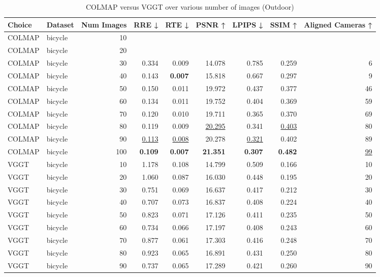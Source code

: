 \begin{table}[H]
\caption{\ifdefined\customcaption \customcaption \else COLMAP versus VGGT over various number of images (Outdoor) \fi}
\label{tab:01_num_images_outdoor}
\centering
\scriptsize
\begin{tabular}{llrrrrrrr}
\toprule
Choice & Dataset & Num Images & RRE ↓ & RTE ↓ & PSNR ↑ & LPIPS ↓ & SSIM ↑ & Aligned Cameras ↑ \\
\midrule
COLMAP & bicycle & 10 &  &  &  &  &  &  \\
COLMAP & bicycle & 20 &  &  &  &  &  &  \\
COLMAP & bicycle & 30 & 0.334 & 0.009 & 14.078 & 0.785 & 0.259 & 6 \\
COLMAP & bicycle & 40 & 0.143 & \textbf{0.007} & 15.818 & 0.667 & 0.297 & 9 \\
COLMAP & bicycle & 50 & 0.150 & 0.011 & 19.972 & 0.437 & 0.377 & 46 \\
COLMAP & bicycle & 60 & 0.134 & 0.011 & 19.752 & 0.404 & 0.369 & 59 \\
COLMAP & bicycle & 70 & 0.120 & 0.010 & 19.711 & 0.365 & 0.370 & 69 \\
COLMAP & bicycle & 80 & 0.119 & 0.009 & \underline{20.295} & 0.341 & \underline{0.403} & 80 \\
COLMAP & bicycle & 90 & \underline{0.113} & \underline{0.008} & 20.278 & \underline{0.321} & 0.402 & 89 \\
COLMAP & bicycle & 100 & \textbf{0.109} & \textbf{0.007} & \textbf{21.351} & \textbf{0.307} & \textbf{0.482} & \underline{99} \\
VGGT & bicycle & 10 & 1.178 & 0.108 & 14.799 & 0.509 & 0.166 & 10 \\
VGGT & bicycle & 20 & 1.060 & 0.087 & 16.030 & 0.448 & 0.195 & 20 \\
VGGT & bicycle & 30 & 0.751 & 0.069 & 16.637 & 0.417 & 0.212 & 30 \\
VGGT & bicycle & 40 & 0.707 & 0.073 & 16.837 & 0.408 & 0.224 & 40 \\
VGGT & bicycle & 50 & 0.823 & 0.071 & 17.126 & 0.411 & 0.235 & 50 \\
VGGT & bicycle & 60 & 0.734 & 0.066 & 17.197 & 0.408 & 0.243 & 60 \\
VGGT & bicycle & 70 & 0.877 & 0.061 & 17.303 & 0.416 & 0.248 & 70 \\
VGGT & bicycle & 80 & 0.923 & 0.065 & 16.891 & 0.431 & 0.250 & 80 \\
VGGT & bicycle & 90 & 0.737 & 0.065 & 17.289 & 0.421 & 0.260 & 90 \\

\end{tabular}
\end{table}
